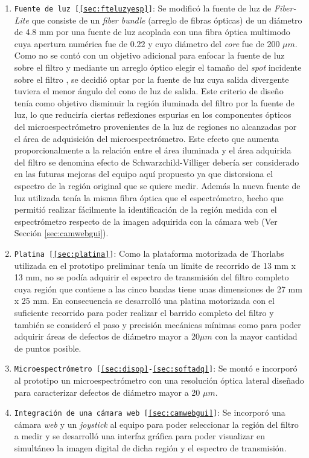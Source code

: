 \begin{enumerate}
\justifying
\item \texttt{Fuente de luz [\ref{sec:fteluzyesp}]}: Se modificó la fuente de luz de \textit{Fiber-Lite} que consiste de un \textit{fiber bundle} (arreglo de fibras ópticas) de un diámetro de 4.8 mm por una fuente de luz acoplada con una fibra óptica multimodo cuya apertura numérica fue de 0.22 y cuyo diámetro del \textit{core} fue de 200 $\mu m$. Como no se contó con un objetivo adicional para enfocar la fuente de luz sobre el filtro y mediante un arreglo óptico elegir el tamaño del \textit{spot} incidente sobre el filtro , se decidió optar por la fuente de luz cuya salida divergente tuviera el menor ángulo del cono de luz de salida. Este criterio de diseño tenía como objetivo disminuir la región iluminada del filtro por la fuente de luz, lo que reduciría ciertas reflexiones espurias en los componentes ópticos del microespectrómetro provenientes de la luz de regiones no alcanzadas por el área de adquisición del microespectrómetro. Este efecto que aumenta proporcionalmente a la relación entre el área iluminada y el área adquirida del filtro se denomina efecto de Schwarzchild-Villiger \cite{Naora279} debería ser considerado en las futuras mejoras del equipo aquí propuesto ya que distorsiona el espectro de la región original que se quiere medir. Además la nueva fuente de luz utilizada tenía la misma fibra óptica que el espectrómetro, hecho que permitió realizar fácilmente la identificación de la región medida con el espectrómetro respecto de la imagen adquirida con la cámara web (Ver Sección \ref{sec:camwebgui}).
\item \texttt{Platina [\ref{sec:platina}]}: Como la plataforma motorizada de Thorlabs utilizada en el prototipo preliminar tenía un límite de recorrido de 13 mm x 13 mm, no se podía adquirir el espectro de transmisión del filtro completo cuya región que contiene a las cinco bandas tiene unas dimensiones de 27 mm x 25 mm. En consecuencia se desarrolló una platina motorizada con el suficiente recorrido para poder realizar el barrido completo del filtro y también se consideró el paso y precisión mecánicas mínimas como para poder adquirir áreas de defectos de diámetro mayor a 20$\mu m$ con la mayor cantidad de puntos posible.
\item \texttt{Microespectrómetro [\ref{sec:disop}-\ref{sec:softadq}]}: Se montó e incorporó al prototipo un microespectrómetro con una resolución óptica lateral diseñado para caracterizar defectos de diámetro mayor a 20 $\mu m$.
\item \texttt{Integración de una cámara web [\ref{sec:camwebgui}]}: Se incorporó una cámara \textit{web} y un  \textit{joystick} al equipo para poder seleccionar la región del filtro a medir y se desarrolló una interfaz gráfica para poder visualizar en simultáneo la imagen digital de dicha región y el espectro de transmisión. 
\end{enumerate}

